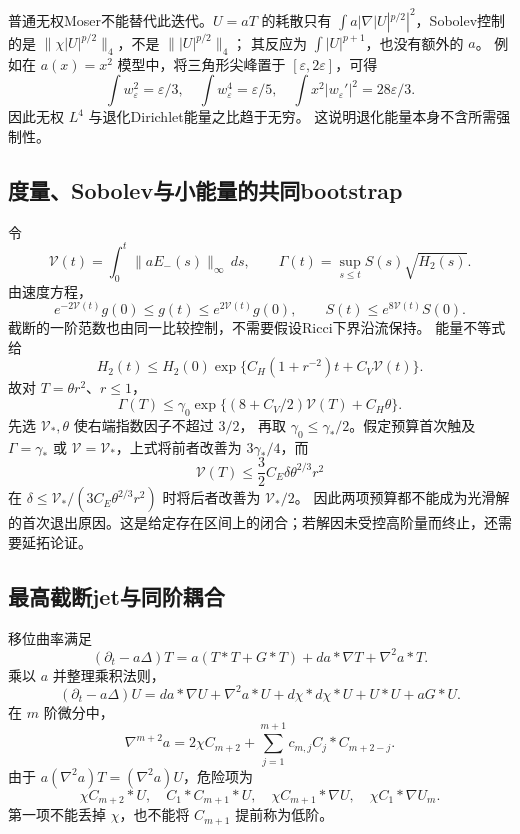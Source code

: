 \documentclass[UTF8,a4paper,11pt,fontset=fandol]{ctexart}
\numberwithin{equation}{section}
\theoremstyle{definition}
\begin{document}
普通无权Moser不能替代此迭代。$U=aT$ 的耗散只有
$\int a|\nabla|U|^{p/2}|^2$，Sobolev控制的是
$\|\chi|U|^{p/2}\|_4$，不是 $\||U|^{p/2}\|_4$；
其反应为 $\int|U|^{p+1}$，也没有额外的 $a$。
例如在 $a(x)=x^2$ 模型中，将三角形尖峰置于 $[\varepsilon,2\varepsilon]$，可得
\[
\int w_\varepsilon^2=\varepsilon/3,\quad
\int w_\varepsilon^4=\varepsilon/5,\quad
\int x^2|w_\varepsilon'|^2=28\varepsilon/3.
\]
因此无权 $L^4$ 与退化Dirichlet能量之比趋于无穷。
这说明退化能量本身不含所需强制性。

\subsection{度量、Sobolev与小能量的共同bootstrap}
令
\[
\mathcal V(t)=\int_0^t\|aE_-(s)\|_\infty\,ds,\qquad
\Gamma(t)=\sup_{s\le t}S(s)\sqrt{H_2(s)}.
\]
由速度方程，
\[
e^{-2\mathcal V(t)}g(0)\le g(t)\le e^{2\mathcal V(t)}g(0),
\qquad S(t)\le e^{8\mathcal V(t)}S(0).
\]
截断的一阶范数也由同一比较控制，不需要假设Ricci下界沿流保持。
能量不等式给
\[
H_2(t)\le H_2(0)\exp\{C_H(1+r^{-2})t+C_V\mathcal V(t)\}.
\]
故对 $T=\theta r^2$、$r\le1$，
\[
\Gamma(T)\le\gamma_0
\exp\{(8+C_V/2)\mathcal V(T)+C_H\theta\}.
\]
先选 $\mathcal V_*,\theta$ 使右端指数因子不超过 $3/2$，
再取 $\gamma_0\le\gamma_*/2$。假定预算首次触及
$\Gamma=\gamma_*$ 或 $\mathcal V=\mathcal V_*$，上式将前者改善为
$3\gamma_*/4$，而
\[
\mathcal V(T)\le\frac32C_E\delta\theta^{2/3}r^2
\]
在 $\delta\le\mathcal V_*/(3C_E\theta^{2/3}r^2)$ 时将后者改善为 $\mathcal V_*/2$。
因此两项预算都不能成为光滑解的首次退出原因。这是给定存在区间上的闭合；若解因未受控高阶量而终止，还需要延拓论证。

\subsection{最高截断jet与同阶耦合}
移位曲率满足
\[
(\partial_t-a\Delta)T
=a(T*T+G*T)+da*\nabla T+\nabla^2a*T.
\]
乘以 $a$ 并整理乘积法则，
\[
(\partial_t-a\Delta)U
=da*\nabla U+\nabla^2a*U+d\chi*d\chi*U+U*U+aG*U.
\]
在 $m$ 阶微分中，
\[
\nabla^{m+2}a
=2\chi C_{m+2}+\sum_{j=1}^{m+1}c_{m,j}C_j*C_{m+2-j}.
\]
由于 $a(\nabla^2a)T=(\nabla^2a)U$，危险项为
\[
\chi C_{m+2}*U,\quad C_1*C_{m+1}*U,\quad
\chi C_{m+1}*\nabla U,\quad\chi C_1*\nabla U_m.
\]
第一项不能丢掉 $\chi$，也不能将 $C_{m+1}$ 提前称为低阶。
\end{document}
